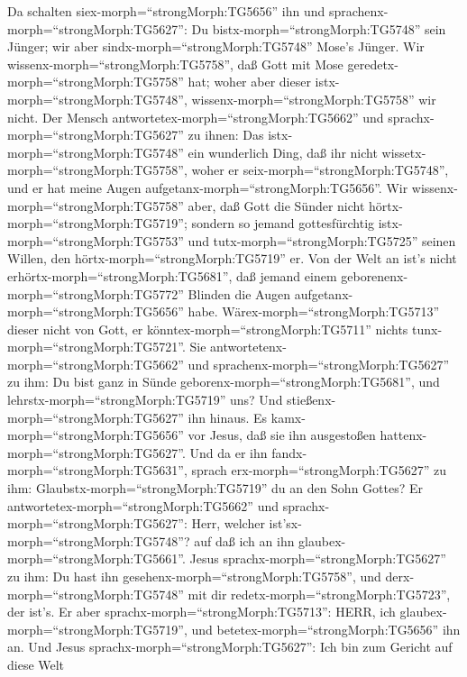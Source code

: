  Da schalten siex-morph=``strongMorph:TG5656'' ihn und
sprachenx-morph=``strongMorph:TG5627'': Du
bistx-morph=``strongMorph:TG5748'' sein Jünger; wir aber
sindx-morph=``strongMorph:TG5748'' Mose's Jünger.  Wir
wissenx-morph=``strongMorph:TG5758'', daß Gott mit Mose
geredetx-morph=``strongMorph:TG5758'' hat; woher aber dieser
istx-morph=``strongMorph:TG5748'', wissenx-morph=``strongMorph:TG5758''
wir nicht.  Der Mensch
antwortetex-morph=``strongMorph:TG5662'' und
sprachx-morph=``strongMorph:TG5627'' zu ihnen: Das
istx-morph=``strongMorph:TG5748'' ein wunderlich Ding, daß ihr nicht
wissetx-morph=``strongMorph:TG5758'', woher er
seix-morph=``strongMorph:TG5748'', und er hat meine Augen
aufgetanx-morph=``strongMorph:TG5656''.  Wir
wissenx-morph=``strongMorph:TG5758'' aber, daß Gott die Sünder nicht
hörtx-morph=``strongMorph:TG5719''; sondern so jemand gottesfürchtig
istx-morph=``strongMorph:TG5753'' und tutx-morph=``strongMorph:TG5725''
seinen Willen, den hörtx-morph=``strongMorph:TG5719'' er. 
Von der Welt an ist's nicht erhörtx-morph=``strongMorph:TG5681'', daß
jemand einem geborenenx-morph=``strongMorph:TG5772'' Blinden die Augen
aufgetanx-morph=``strongMorph:TG5656'' habe. 
Wärex-morph=``strongMorph:TG5713'' dieser nicht von Gott, er
könntex-morph=``strongMorph:TG5711'' nichts
tunx-morph=``strongMorph:TG5721''.  Sie
antwortetenx-morph=``strongMorph:TG5662'' und
sprachenx-morph=``strongMorph:TG5627'' zu ihm: Du bist ganz in Sünde
geborenx-morph=``strongMorph:TG5681'', und
lehrstx-morph=``strongMorph:TG5719'' uns? Und
stießenx-morph=``strongMorph:TG5627'' ihn hinaus.  Es
kamx-morph=``strongMorph:TG5656'' vor Jesus, daß sie ihn ausgestoßen
hattenx-morph=``strongMorph:TG5627''. Und da er ihn
fandx-morph=``strongMorph:TG5631'', sprach
erx-morph=``strongMorph:TG5627'' zu ihm:
Glaubstx-morph=``strongMorph:TG5719'' du an den Sohn Gottes?
 Er antwortetex-morph=``strongMorph:TG5662'' und
sprachx-morph=``strongMorph:TG5627'': Herr, welcher
ist'sx-morph=``strongMorph:TG5748''? auf daß ich an ihn
glaubex-morph=``strongMorph:TG5661''.  Jesus
sprachx-morph=``strongMorph:TG5627'' zu ihm: Du hast ihn
gesehenx-morph=``strongMorph:TG5758'', und
derx-morph=``strongMorph:TG5748'' mit dir
redetx-morph=``strongMorph:TG5723'', der ist's.  Er aber
sprachx-morph=``strongMorph:TG5713'': HERR, ich
glaubex-morph=``strongMorph:TG5719'', und
betetex-morph=``strongMorph:TG5656'' ihn an.  Und Jesus
sprachx-morph=``strongMorph:TG5627'': Ich bin zum Gericht auf diese Welt
